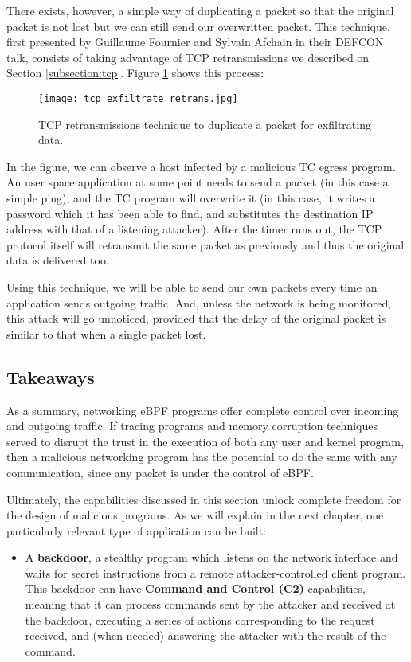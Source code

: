 There exists, however, a simple way of duplicating a packet so that the original packet is not lost but we can still send our overwritten packet. This technique, first presented by Guillaume Fournier and Sylvain Afchain in their DEFCON talk, consists of taking advantage of TCP retransmissions we described on Section \ref{subsection:tcp}. Figure \ref{fig:tcp_exfiltrate_retrans} shows this process:

\begin{figure}[H]
	\centering
	\texttt{[image: tcp\_exfiltrate\_retrans.jpg]}
	\caption{TCP retransmissions technique to duplicate a packet for exfiltrating data.}
	\label{fig:tcp_exfiltrate_retrans}
\end{figure}

In the figure, we can observe a host infected by a malicious TC egress program. An user space application at some point needs to send a packet (in this case a simple ping), and the TC program will overwrite it (in this case, it writes a password which it has been able to find, and substitutes the destination IP address with that of a listening attacker).
After the timer runs out, the TCP protocol itself will retransmit the same packet as previously and thus the original data is delivered too.

Using this technique, we will be able to send our own packets every time an application sends outgoing traffic. And, unless the network is being monitored, this attack will go unnoticed, provided that the delay of the original packet is similar to that when a single packet lost.

\subsection{Takeaways}
As a summary, networking eBPF programs offer complete control over incoming and outgoing traffic. If tracing programs and memory corruption techniques served to disrupt the trust in the execution of both any user and kernel program, then a malicious networking program has the potential to do the same with any communication, since any packet is under the control of eBPF.

Ultimately, the capabilities discussed in this section unlock complete freedom for the design of malicious programs. As we will explain in the next chapter, one particularly relevant type of application can be built:
\begin{itemize}
\item A \textbf{backdoor}, a stealthy program which listens on the network interface and waits for secret instructions from a remote attacker-controlled client program. This backdoor can have \textbf{Command and Control (C2)} capabilities, meaning that it can process commands sent by the attacker and received at the backdoor, executing a series of actions corresponding to the request received, and (when needed) answering the attacker with the result of the command.
\end{itemize}


